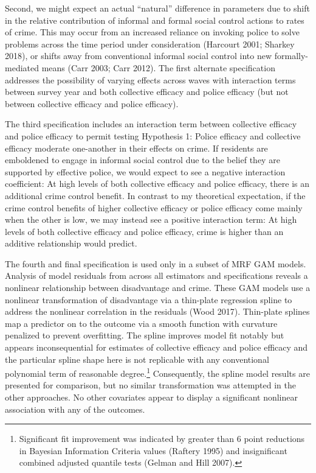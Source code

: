 \documentclass [11pt, proquest] {uwthesis}[2015/03/03]
\begin{document}
Second, we might expect an actual ``natural'' difference in parameters due to shift in the relative contribution of informal and formal social control actions to rates of crime. This may occur from an increased reliance on invoking police to solve problems across the time period under consideration (Harcourt 2001; Sharkey 2018), or shifts away from conventional informal social control into new formally-mediated means (Carr 2003; Carr 2012). The first alternate specification addresses the possibility of varying effects across waves with interaction terms between survey year and both collective efficacy and police efficacy (but not between collective efficacy and police efficacy).

The third specification includes an interaction term between collective efficacy and police efficacy to permit testing Hypothesis 1: Police efficacy and collective efficacy moderate one-another in their effects on crime. If residents are emboldened to engage in informal social control due to the belief they are supported by effective police, we would expect to see a negative interaction coefficient: At high levels of both collective efficacy and police efficacy, there is an additional crime control benefit. In contrast to my theoretical expectation, if the crime control benefits of higher collective efficacy or police efficacy come mainly when the other is low, we may instead see a positive interaction term: At high levels of both collective efficacy and police efficacy, crime is higher than an additive relationship would predict.

The fourth and final specification is used only in a subset of MRF GAM models. Analysis of model residuals from across all estimators and specifications reveals a nonlinear relationship between disadvantage and crime. These GAM models use a nonlinear transformation of disadvantage via a thin-plate regression spline to address the nonlinear correlation in the residuals (Wood 2017). Thin-plate splines map a predictor on to the outcome via a smooth function with curvature penalized to prevent overfitting. The spline improves model fit notably but appears inconsequential for estimates of collective efficacy and police efficacy and the particular spline shape here is not replicable with any conventional polynomial term of reasonable degree.\footnote{Significant fit improvement was indicated by greater than 6 point reductions in Bayesian Information Criteria values (Raftery 1995) and insignificant combined adjusted quantile tests (Gelman and Hill 2007).} Consequently, the spline model results are presented for comparison, but no similar transformation was attempted in the other approaches. No other covariates appear to display a significant nonlinear association with any of the outcomes.
\end{document}
